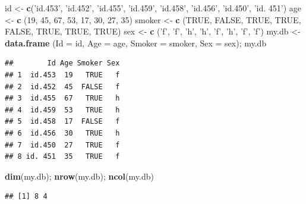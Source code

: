 \documentclass[]{book}
\newenvironment{Shaded}{\begin{snugshade}}{\end{snugshade}}
\newcommand{\DataTypeTok}[1]{\textcolor[rgb]{0.13,0.29,0.53}{#1}}
\newcommand{\DecValTok}[1]{\textcolor[rgb]{0.00,0.00,0.81}{#1}}
\newcommand{\KeywordTok}[1]{\textcolor[rgb]{0.13,0.29,0.53}{\textbf{#1}}}
\newcommand{\NormalTok}[1]{#1}
\newcommand{\OtherTok}[1]{\textcolor[rgb]{0.56,0.35,0.01}{#1}}
\newcommand{\StringTok}[1]{\textcolor[rgb]{0.31,0.60,0.02}{#1}}
\begin{document}
\begin{Shaded}
\begin{Highlighting}[]
\NormalTok{id <-}\StringTok{ }\KeywordTok{c}\NormalTok{(}\StringTok{'id.453'}\NormalTok{, }\StringTok{'id.452'}\NormalTok{, }\StringTok{'id.455'}\NormalTok{, }\StringTok{'id.459'}\NormalTok{, }\StringTok{'id.458'}\NormalTok{, }\StringTok{'id.456'}\NormalTok{, }\StringTok{'id.450'}\NormalTok{, }\StringTok{'id. 451'}\NormalTok{)}
\NormalTok{age <-}\StringTok{ }\KeywordTok{c}\NormalTok{ (}\DecValTok{19}\NormalTok{, }\DecValTok{45}\NormalTok{, }\DecValTok{67}\NormalTok{, }\DecValTok{53}\NormalTok{, }\DecValTok{17}\NormalTok{, }\DecValTok{30}\NormalTok{, }\DecValTok{27}\NormalTok{, }\DecValTok{35}\NormalTok{)}
\NormalTok{smoker <-}\StringTok{ }\KeywordTok{c}\NormalTok{ (}\OtherTok{TRUE}\NormalTok{, }\OtherTok{FALSE}\NormalTok{, }\OtherTok{TRUE}\NormalTok{, }\OtherTok{TRUE}\NormalTok{, }\OtherTok{FALSE}\NormalTok{, }\OtherTok{TRUE}\NormalTok{, }\OtherTok{TRUE}\NormalTok{, }\OtherTok{TRUE}\NormalTok{)}
\NormalTok{sex <-}\StringTok{ }\KeywordTok{c}\NormalTok{ (}\StringTok{'f'}\NormalTok{, }\StringTok{'f'}\NormalTok{, }\StringTok{'h'}\NormalTok{, }\StringTok{'h'}\NormalTok{, }\StringTok{'f'}\NormalTok{, }\StringTok{'h'}\NormalTok{, }\StringTok{'f'}\NormalTok{, }\StringTok{'f'}\NormalTok{)}
\NormalTok{my.db <-}\StringTok{ }\KeywordTok{data.frame}\NormalTok{ (}\DataTypeTok{Id =}\NormalTok{ id, }\DataTypeTok{Age =}\NormalTok{ age, }\DataTypeTok{Smoker =}\NormalTok{ smoker, }\DataTypeTok{Sex =}\NormalTok{ sex); my.db}
\end{Highlighting}
\end{Shaded}

\begin{verbatim}
##        Id Age Smoker Sex
## 1  id.453  19   TRUE   f
## 2  id.452  45  FALSE   f
## 3  id.455  67   TRUE   h
## 4  id.459  53   TRUE   h
## 5  id.458  17  FALSE   f
## 6  id.456  30   TRUE   h
## 7  id.450  27   TRUE   f
## 8 id. 451  35   TRUE   f
\end{verbatim}

\begin{Shaded}
\begin{Highlighting}[]
\KeywordTok{dim}\NormalTok{(my.db); }\KeywordTok{nrow}\NormalTok{(my.db); }\KeywordTok{ncol}\NormalTok{(my.db)}
\end{Highlighting}
\end{Shaded}

\begin{verbatim}
## [1] 8 4
\end{verbatim}
\end{document}

